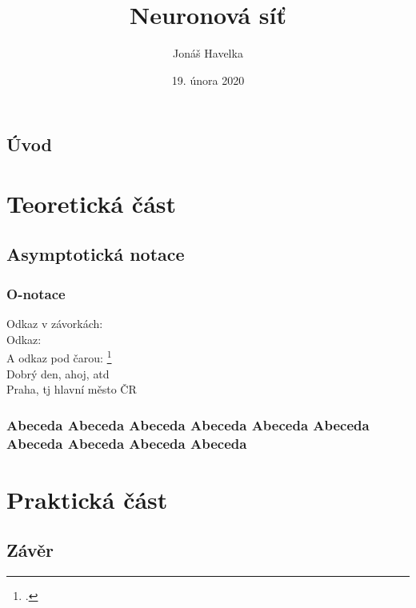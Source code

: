 \documentclass[12pt]{report}			%
\author{Jonáš Havelka}
\title{Neuronová síť}
\date{19. února 2020}
\begin{document}
	\mytitlepage						%
	
	
	\abstrakt{
		\lipsum[1]						%
	}{
		\lipsum[1]						%
	}
	
	\podekovani{
		\lipsum[2]						%
	}
	
	\tableofcontents\newpage			%
	
	
	
	
	\chapter*{Úvod}
	
		\lipsum[1]	
	
	
	\part{Teoretická část}
	
		\chapter{Asymptotická notace}
			
			\section{O-notace}
				Odkaz v závorkách: \parencite[see][page 900]{einstein}\\
				Odkaz: \cite{knuthwebsite}\\
				A odkaz pod čarou: \footcite[see][s. 42]{latexcompanion}\\
				Dobrý den, ahoj, \gls{atd}\\
				Praha, \gls{tj} hlavní město ČR
				
			\section{Abeceda Abeceda Abeceda Abeceda Abeceda Abeceda Abeceda Abeceda Abeceda Abeceda }
		
	\part{Praktická část}



	\appendix
	
	\chapter*{Závěr}
	
		\lipsum[1]
	
	\nocite{*}
    \printbibliography					%
    \printglossary[title={Zkratky}]		%
    
    \begin{prilohy}
    \end{prilohy}
\end{document}
